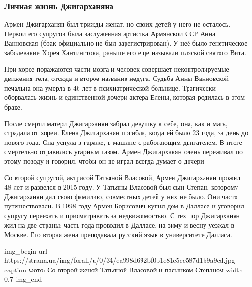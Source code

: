  
 
 

\subsubsection{Личная жизнь Джигарханяна}
\label{sec:14_11_2020.news.ua.strana.1.deaths.armen_dzhiharnajan.lichnaja_zhizn}

Армен Джигарханян был трижды женат, но своих детей у него не осталось.
Первой его супругой была заслуженная артистка Армянской ССР Анна
Ванновская (брак официально не был зарегистрирован). У неё было
генетическое заболевание \dshM Хорея Хантингтона, раньше его еще называли
пляской святого Вита.

При хорее поражаются части мозга и человек совершает неконтролируемые
движения тела, отсюда и второе название недуга. Судьба Анны Ванновской
печальна \dshM она умерла в 46 лет в психиатрической больнице. Трагически
оборвалась жизнь и единственной дочери актера Елены, которая родилась в
этом браке.

После смерти матери Джигарханян забрал девушку к себе, она, как и мать,
страдала от хореи. Елена Джигарханян погибла, когда ей было 23 года, за
день до нового года. Она уснула в гараже, в машине с работающим
двигателем. В итоге смертельно отравилась угарным газом. Армен Джигарханян
очень переживал по этому поводу и говорил, чтобы он не играл \dshM всегда
думает о дочери.

Со второй супругой, актрисой Татьяной Власовой, Армен Джигарханян прожил
48 лет и развелся в 2015 году. У Татьяны Власовой был сын Степан, которому
Джигарханян дал свою фамилию, совместных детей у них не было. Они часто
путешествовали. В 1998 году Армен Борисович купил дом в Далласе и уговорил
супругу переехать и присматривать за недвижимостью. С тех пор Джигарханян
жил на две страны: часть года проводил в Далласе, на зиму и весну \dshM уезжал
в Москве. Его вторая жена преподавала русский язык в университете Далласа.

\ifcmt
img_begin 
	url https://strana.ua/img/forall/u/0/34/ea998d692bf0b1e81c5cc587d1b9a9cd.jpg
	caption Фото: Со второй женой Татьяной Власовой и пасынком Степаном
	width 0.7
img_end
\fi

